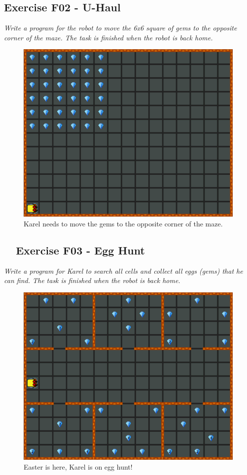 \documentclass[article,A4,12pt]{llncs}
\begin{document}
{{{{\subsection{Exercise F02 - U-Haul}

{\em Write a program for the robot to move the 6x6 square of gems to the opposite corner of the maze. The task is finished when the robot is back home.}

\begin{figure}[!ht]
\begin{center}
\includegraphics[height=0.4\textwidth]{img/f02.png}
\end{center}
\vspace{-4mm}
\caption{Karel needs to move the gems to the opposite corner of the maze.}
\label{fig:f02}
\vspace{-10mm}
\end{figure}
\noindent
\newpage

\subsection{\ \ Exercise F03 - Egg Hunt}

{\em Write a program for Karel to search all cells and collect all eggs (gems) that he can find. The task is finished when the robot is back home.}


\begin{figure}[!ht]
\begin{center}
\includegraphics[height=0.4\textwidth]{img/f03.png}
\end{center}
\vspace{-4mm}
\caption{Easter is here, Karel is on egg hunt!}
\label{fig:f03}
\vspace{-10mm}
\end{figure}
\noindent

}}}}
\end{document}
